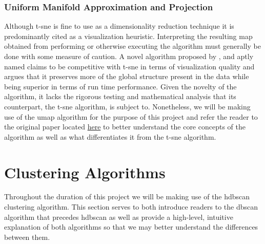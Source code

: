 \subsubsection{Uniform Manifold Approximation and Projection}
\label{subsec:Background-Information:Dimension-Reduction:t-Distributed-Stochastic-Neighbor-Embedding:Uniform-Manifold-Approximation-and-Projection}
Although \gls{t-sne} is fine to use as a dimensionality reduction technique it is predominantly cited as a visualization heuristic. Interpreting the resulting map obtained from performing or otherwise executing the algorithm must generally be done with some measure of caution. A novel algorithm proposed by \citet{UMAP}, and aptly named  claims to be competitive with \gls{t-sne} in terms of visualization quality and argues that it preserves more of the global structure present in the data while being superior in terms of run time performance. Given the novelty of the algorithm, it lacks the rigorous testing and mathematical analysis that its counterpart, the \gls{t-sne} algorithm, is subject to. Nonetheless, we will be making use of the \gls{umap} algorithm for the purpose of this project and refer the reader to the original paper located \href{https://arxiv.org/abs/1802.03426}{here} \cite{UMAP} to better understand the core concepts of the algorithm as well as what differentiates it from the \gls{t-sne} algorithm.

\clearpage

\section{Clustering Algorithms}
\label{sec:Background-Information:Clustering-Algorithms}
Throughout the duration of this project we will be making use of the \gls{hdbscan} clustering algorithm. This section serves to both introduce readers to the \gls{dbscan} algorithm that precedes \gls{hdbscan} as well as provide a high-level, intuitive explanation of both algorithms so that we may better understand the differences between them.


